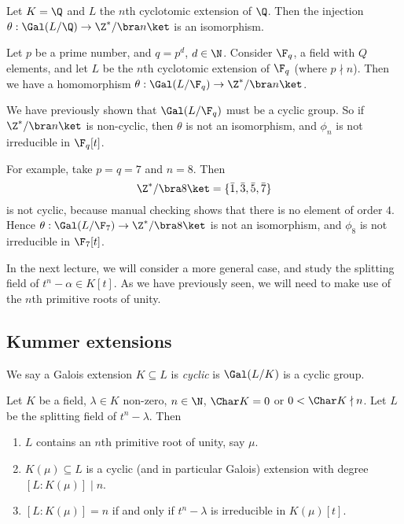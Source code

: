 \documentclass[a4paper]{article}
\begin{document}
\begin{cor}
  Let $K = \Q$ and $L$ the $n$th cyclotomic extension of $\Q$. Then the injection $\theta: \Gal(L/\Q) \to \Z^*/\bra n\ket$ is an isomorphism.
\end{cor}

\begin{eg}
  Let $p$ be a prime number, and $q = p^d$, $d \in \N$. Consider $\F_q$, a field with $Q$ elements, and let $L$ be the $n$th cyclotomic extension of $\F_q$ (where $p\nmid n$). Then we have a homomorphism $\theta: \Gal(L/\F_q) \rightarrow \Z^*/\bra n\ket$.

  We have previously shown that $\Gal(L/\F_q)$ must be a cyclic group. So if $\Z^*/\bra n\ket$ is non-cyclic, then $\theta$ is not an isomorphism, and $\phi_n$ is not irreducible in $\F_q[t]$.

  For example, take $p = q = 7$ and $n = 8$. Then
  \[
    \Z^*/\bra 8\ket = \{\bar{1}, \bar{3}, \bar{5}, \bar{7}\}
  \]
  is not cyclic, because manual checking shows that there is no element of order $4$. Hence $\theta: \Gal(L/\F_7) \to \Z^*/\bra 8\ket$ is not an isomorphism, and $\phi_8$ is not irreducible in $\F_7[t]$.
\end{eg}

In the next lecture, we will consider a more general case, and study the splitting field of $t^n - \alpha \in K[t]$. As we have previously seen, we will need to make use of the $n$th primitive roots of unity.

\subsection{Kummer extensions}
\begin{defi}
  We say a Galois extension $K\subseteq L$ is \emph{cyclic} is $\Gal(L/K)$ is a cyclic group.
\end{defi}

\begin{thm}
  Let $K$ be a field, $\lambda \in K$ non-zero, $n \in \N$, $\Char K = 0$ or $0 < \Char K \nmid n$. Let $L$ be the splitting field of $t^n - \lambda$. Then
  \begin{enumerate}
    \item $L$ contains an $n$th primitive root of unity, say $\mu$.
    \item $K(\mu) \subseteq L$ is a cyclic (and in particular Galois) extension with degree $[L:K(\mu)] \mid n$.
    \item $[L:K(\mu)] = n$ if and only if $t^n - \lambda$ is irreducible in $K(\mu)[t]$.
  \end{enumerate}
\end{thm}
\end{document}
